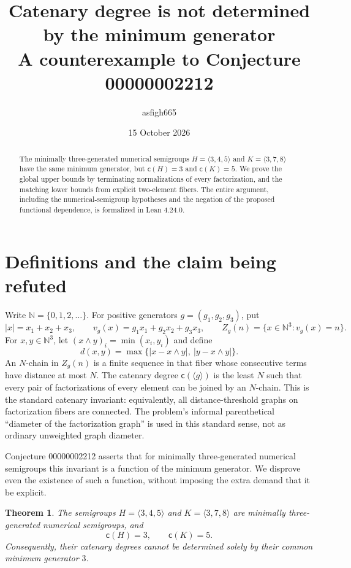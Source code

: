 \documentclass[11pt]{article}
\title{Catenary degree is not determined by the minimum generator\\
\large A counterexample to Conjecture 00000002212}
\author{asfigh665}
\date{15 October 2026}
\newtheorem{theorem}{Theorem}
\newcommand{\N}{\mathbb N}
\newcommand{\cdeg}{\mathsf c}
\begin{document}
\maketitle

\begin{abstract}
The minimally three-generated numerical semigroups
$H=\langle3,4,5\rangle$ and $K=\langle3,7,8\rangle$ have the same
minimum generator, but $\cdeg(H)=3$ and $\cdeg(K)=5$.
We prove the global upper bounds by terminating normalizations of every
factorization, and the matching lower bounds from explicit two-element fibers.
The entire argument, including the numerical-semigroup hypotheses and the
negation of the proposed functional dependence, is formalized in Lean 4.24.0.
\end{abstract}

\section{Definitions and the claim being refuted}
Write $\N=\{0,1,2,\ldots\}$. For positive generators $g=(g_1,g_2,g_3)$,
put
\[
 |x|=x_1+x_2+x_3,\qquad
 v_g(x)=g_1x_1+g_2x_2+g_3x_3,\qquad
 Z_g(n)=\{x\in\N^3:v_g(x)=n\}.
\]
For $x,y\in\N^3$, let $(x\wedge y)_i=\min(x_i,y_i)$ and define
\[
 d(x,y)=\max\{|x-x\wedge y|,\ |y-x\wedge y|\}.
\]
An $N$-chain in $Z_g(n)$ is a finite sequence in that fiber whose consecutive
terms have distance at most $N$. The catenary degree $\cdeg(\langle g\rangle)$
is the least $N$ such that every pair of factorizations of every element can be
joined by an $N$-chain. This is the standard catenary invariant: equivalently,
all distance-threshold graphs on factorization fibers are connected. The
problem's informal parenthetical ``diameter of the factorization graph'' is
used in this standard sense, not as ordinary unweighted graph diameter.

Conjecture 00000002212 asserts that for minimally three-generated numerical
semigroups this invariant is a function of the minimum generator. We disprove
even the existence of such a function, without imposing the extra demand
that it be explicit.

\begin{theorem}\label{thm:main}
The semigroups $H=\langle3,4,5\rangle$ and $K=\langle3,7,8\rangle$ are
minimally three-generated numerical semigroups, and
\[
\cdeg(H)=3,\qquad \cdeg(K)=5.
\]
Consequently, their catenary degrees cannot be determined solely by their
common minimum generator $3$.
\end{theorem}
\end{document}

